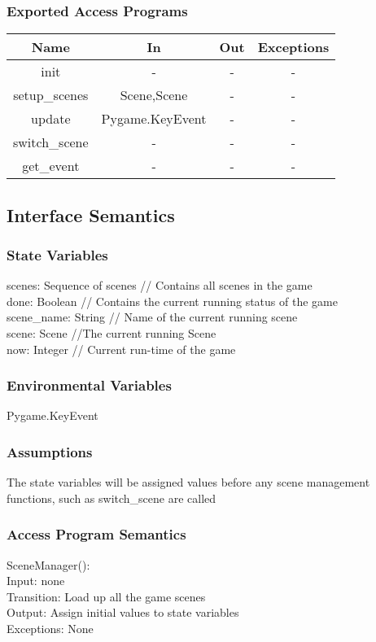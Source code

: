 \documentclass[12pt, titlepage]{article}
\begin{document}
\subsubsection{Exported Access Programs}
\begin{tabular}[pos]{|c|c|c|c|}
\hline
\textbf{Name}& \textbf{In} & \textbf{Out} & \textbf{Exceptions} \\ \hline
init &-  &-  &- \\ \hline
 setup\_scenes&Scene,Scene  & - &- \\ \hline
 update & Pygame.KeyEvent & - & -\\ \hline
 switch\_scene& -  & - & -\\ \hline
 get\_event& - & - & -\\ \hline
\end{tabular}
\subsection{Interface Semantics}
\subsubsection{State Variables}
scenes: Sequence of scenes // Contains all scenes in the game\\ 
done: Boolean // Contains the current running status of the game\\
scene\_name: String // Name of the current running scene\\
scene: Scene //The current running Scene\\
now: Integer // Current run-time of the game

\subsubsection{Environmental Variables}
Pygame.KeyEvent
\subsubsection{Assumptions}
The state variables will be assigned values before any scene management functions, such as switch\_scene are called
\subsubsection{Access Program Semantics} 

SceneManager(): \\
Input: none \\
Transition: Load up all the game scenes \\
Output: Assign initial values to state variables \\
Exceptions: None \\ 
\end{document}
